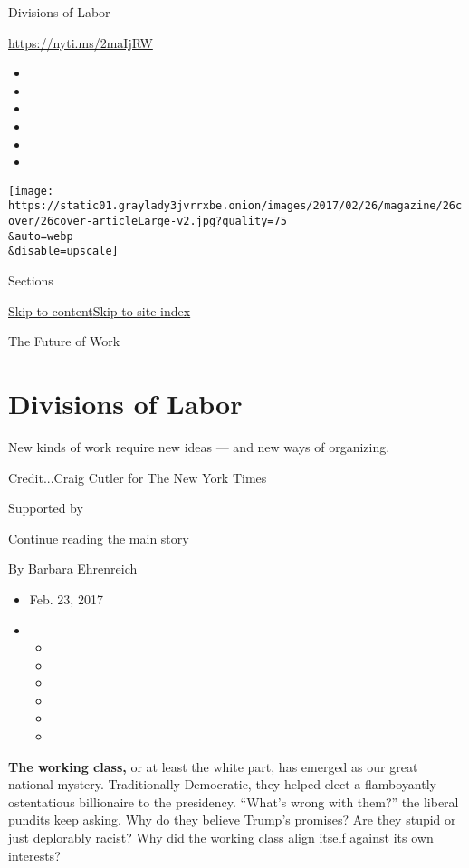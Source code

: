 Divisions of Labor

\url{https://nyti.ms/2maIjRW}

\begin{itemize}
\item
\item
\item
\item
\item
\item
\end{itemize}

\texttt{[image: https://static01.graylady3jvrrxbe.onion/images/2017/02/26/magazine/26cover/26cover-articleLarge-v2.jpg?quality=75\\\&auto=webp\\\&disable=upscale]}

Sections

\protect\hyperlink{site-content}{Skip to
content}\protect\hyperlink{site-index}{Skip to site index}

The Future of Work

\hypertarget{divisions-of-labor}{%
\section{Divisions of Labor}\label{divisions-of-labor}}

New kinds of work require new ideas --- and new ways of organizing.

Credit...Craig Cutler for The New York Times

Supported by

\protect\hyperlink{after-sponsor}{Continue reading the main story}

By Barbara Ehrenreich

\begin{itemize}
\item
  Feb. 23, 2017
\item
  \begin{itemize}
  \item
  \item
  \item
  \item
  \item
  \item
  \end{itemize}
\end{itemize}

\textbf{The working class,} or at least the white part, has emerged as
our great national mystery. Traditionally Democratic, they helped elect
a flamboyantly ostentatious billionaire to the presidency. ``What's
wrong with them?'' the liberal pundits keep asking. Why do they believe
Trump's promises? Are they stupid or just deplorably racist? Why did the
working class align itself against its own interests?

